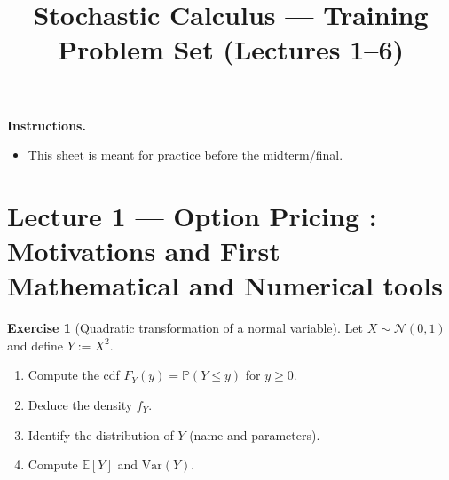 \documentclass[11pt]{article}
\title{Stochastic Calculus --- Training Problem Set (Lectures 1--6)}
\author{}
\date{}
\newcommand{\1}{\mathbf{1}}
\theoremstyle{definition}
\newtheorem{exercise}{Exercise}[section]
\begin{document}
\maketitle
\vspace{-1.2em}

\noindent\textbf{Instructions.}
\begin{itemize}[leftmargin=1.6em]
  \item This sheet is meant for practice before the midterm/final.
\end{itemize}

\section{Lecture 1 --- Option Pricing : Motivations and First Mathematical and Numerical tools}

\begin{exercise}[Quadratic transformation of a normal variable]
Let $X\sim \mathcal N(0,1)$ and define $Y:=X^2$.
\begin{enumerate}[label=\textbf{(\alph*)}, itemsep=0.25em]
  \item Compute the cdf $F_Y(y)=\mathbb P(Y\le y)$ for $y\ge 0$.
  \item Deduce the density $f_Y$.
  \item Identify the distribution of $Y$ (name and parameters).
  \item Compute $\mathbb E[Y]$ and $\mathrm{Var}(Y)$.
\end{enumerate}
\end{exercise}
\end{document}
